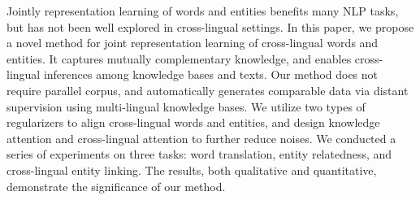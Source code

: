 Jointly representation learning of words and entities benefits many NLP tasks, but has not been well explored in cross-lingual settings. In this paper, we propose a novel method for joint representation learning of cross-lingual words and entities. It captures mutually complementary knowledge, and enables cross-lingual inferences among knowledge bases and texts. Our method does not require parallel corpus, and automatically generates comparable data via distant supervision using multi-lingual knowledge bases. We utilize two types of regularizers to align cross-lingual words and entities, and design knowledge attention and cross-lingual attention to further reduce noises. We conducted a series of experiments on three tasks: word translation, entity relatedness, and cross-lingual entity linking. The results, both qualitative and quantitative, demonstrate the significance of our method.
